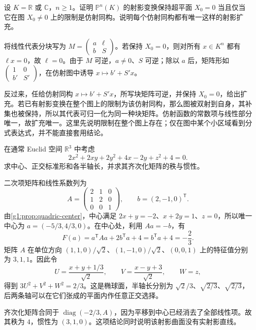 \begin{exercise}\label{g1:ex:affine-projective-group}
	设 \(K=\mathbb R\) 或 \(\mathbb C\)，\(n\geq1\)。证明 \(\mathbb P^n(K)\) 的射影变换保持超平面 \(X_0=0\) 当且仅当它在图 \(X_0\ne0\) 上的限制是仿射同构。说明每个仿射同构都有唯一这样的射影扩充。
\end{exercise}
\begin{solution}
	将线性代表分块写为 \(M=\begin{pmatrix}a&\ell\\b&S\end{pmatrix}\)。若保持 \(X_0=0\)，则对所有 \(x\in K^n\) 都有 \(\ell x=0\)，故 \(\ell=0\)。由于 \(M\) 可逆，\(a\ne0\)、\(S\) 可逆；除以 \(a\) 后，矩阵形如 \(\begin{pmatrix}1&0\\b'&S'\end{pmatrix}\)，在仿射图中诱导 \(x\mapsto b'+S'x\)。

	反过来，任给仿射同构 \(x\mapsto b'+S'x\)，所写块矩阵可逆，并保持 \(X_0=0\)，给出扩充。若已有射影变换在整个图上的限制为该仿射同构，那么图被双射到自身，其补集也被保持，所以其代表可归一化为同一种块矩阵。仿射函数的常数项与线性部分唯一，故扩充唯一。这里先说明限制在整个图上存在；仅在图中某个小区域看到分式表达式，并不能直接套用结论。
\end{solution}

\begin{exercise}
	\label{g1:ex:quadric-center-axes}
	在通常 Euclid 空间 \(\mathbb R^3\) 中考虑
	\[
		2x^2+2xy+2y^2+4x-2y+z^2+4=0.
	\]
	求中心、正交标准形和各半轴长，并求其齐次化矩阵的秩与惯性。
\end{exercise}
\begin{solution}
	二次项矩阵和线性系数列为
	\[
		A=\begin{pmatrix}2&1&0\\1&2&0\\0&0&1\end{pmatrix},
		\qquad b=(2,-1,0)^{\mathsf T}.
	\]
	由\cref{g1:prop:quadric-center}，中心满足 \(2x+y=-2\)、\(x+2y=1\)、\(z=0\)，所以唯一中心为 \(a=(-5/3,4/3,0)\)。在中心处，利用 \(Aa=-b\)，有
	\[
		F(a)=a^{\mathsf T}Aa+2b^{\mathsf T}a+4
		=b^{\mathsf T}a+4=-\frac23.
	\]
	矩阵 \(A\) 在单位方向 \((1,1,0)/\sqrt2\)、\((1,-1,0)/\sqrt2\)、\((0,0,1)\) 上的特征值分别为 \(3,1,1\)。因此令
	\[
		U=\frac{x+y+1/3}{\sqrt2},\qquad
		V=\frac{x-y+3}{\sqrt2},\qquad W=z,
	\]
	得到 \(3U^2+V^2+W^2=2/3\)。这是椭球面，半轴长分别为 \(\sqrt2/3\)、\(\sqrt{2/3}\)、\(\sqrt{2/3}\)，后两条轴可以在它们张成的平面内作任意正交选择。

	齐次化矩阵合同于 \(\operatorname{diag}(-2/3,A)\)，因为平移到中心已经消去了全部线性项。故其秩为 \(4\)，惯性为 \((3,1,0)\)。这项结论同时说明该射影曲面没有实射影直线。
\end{solution}

